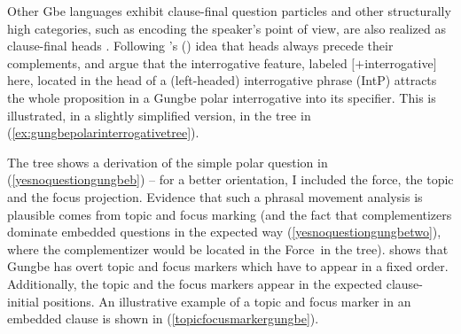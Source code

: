 \noindent Other Gbe languages exhibit clause-final question particles and other structurally high categories, such as encoding the speaker's point of view, are also realized as clause-final heads \citep[211--213]{lefebvre2006creole}. Following \citeauthor{kayne1994antisymmetry}'s (\citeyear{kayne1994antisymmetry}) idea that heads always precede their complements, \citet{aboh2004morphosyntax} and  \citet{aboh2004left} argue that the interrogative feature, labeled $[+$interrogative$]$ here, located in the head of a (left-headed) interrogative phrase (IntP) attracts the whole proposition in a Gungbe polar interrogative into its specifier. This is illustrated, in a slightly simplified version, in the tree in (\ref{ex:gungbepolarinterrogativetree}).

\begin{exe}
\ex\label{ex:gungbepolarinterrogativetree} 
\begin{adjustbox}{width=\linewidth}
\end{adjustbox}
\end{exe}


\noindent The tree shows a derivation of the simple polar question in (\ref{yesnoquestiongungbeb}) -- for a better orientation, I included the force, the topic and the focus projection. Evidence that such a phrasal movement analysis is plausible comes from topic and focus marking (and the fact that complementizers dominate embedded questions in the expected way (\ref{yesnoquestiongungbetwo}), where the complementizer would be located in the Force\textdegree\ in the tree). \citet{aboh2004left} shows that Gungbe has overt topic and focus markers which have to appear in a fixed order. Additionally, the topic and the focus markers appear in the expected clause-initial positions. An illustrative example of a topic and focus marker in an embedded clause is shown in (\ref{topicfocusmarkergungbe}).


